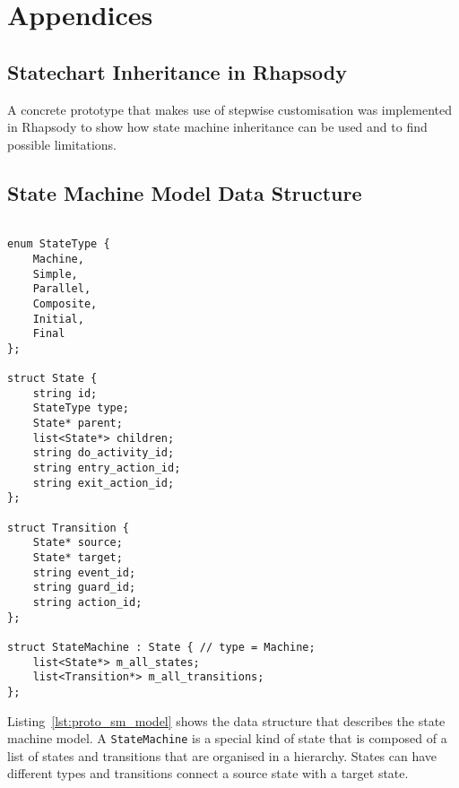 \appendix

\section*{Appendices}
\renewcommand{\thesubsection}{\Alph{subsection}}

\label{annex:framework}

\subsection{Statechart Inheritance in Rhapsody\label{annex:proto_inheritance}}

A concrete prototype that makes use of stepwise customisation was implemented in Rhapsody to
show how state machine inheritance can be used and to find possible limitations.




\clearpage
\subsection{State Machine Model Data Structure\label{annex:proto_delta}}

\begin{lstlisting}[language=CXX, label={lst:proto_sm_model}, caption={State machine model data structure.}]

enum StateType {
    Machine,
    Simple,
    Parallel,
    Composite,
    Initial,
    Final
};

struct State {
    string id;
    StateType type;
    State* parent;
    list<State*> children;
    string do_activity_id;
    string entry_action_id;
    string exit_action_id;
};

struct Transition {
    State* source;
    State* target;
    string event_id;
    string guard_id;
    string action_id;
};

struct StateMachine : State { // type = Machine;
    list<State*> m_all_states;
    list<Transition*> m_all_transitions;
};

\end{lstlisting}

Listing~\ref{lst:proto_sm_model} shows the data structure that describes the state machine model.
A \lstinline{StateMachine} is a special kind of state that is composed of a list of states and
transitions that are organised in a hierarchy. States can have different types and transitions
connect a source state with a target state.


